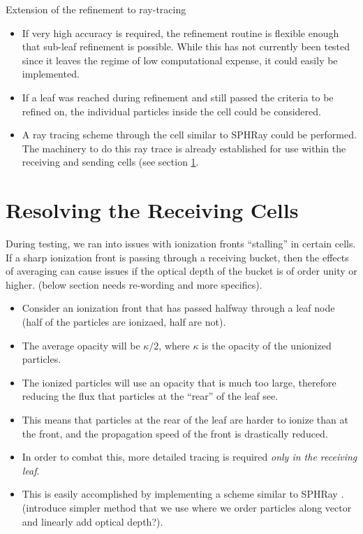 Extension of the refinement to ray-tracing
\begin{itemize}
\item If very high accuracy is required, the refinement routine is flexible enough that sub-leaf refinement is possible. While this has not currently been tested since it leaves the regime of low computational expense, it could easily be implemented.
\item If a leaf was reached during refinement and still passed the criteria to be refined on, the individual particles inside the cell could be considered.
\item A ray tracing scheme through the cell similar to SPHRay \citep{altayCroftPelupessy08} could be performed. The machinery to do this ray trace is already established for use within the receiving and sending cells (see section \ref{sec:resolvingleaves}.
\end{itemize}

\section{Resolving the Receiving Cells}
\label{sec:resolvingleaves}

During testing, we ran into issues with ionization fronts ``stalling'' in certain cells. If a sharp ionization front is passing through a receiving bucket, then the effects of averaging can cause issues if the optical depth of the bucket is of order unity or higher. (below section needs re-wording and more specifics).

\begin{itemize}
\item Consider an ionization front that has passed halfway through a leaf node (half of the particles are ionizaed, half are not).
\item The average opacity will be $\kappa/2$, where $\kappa$ is the opacity of the unionized particles.
\item The ionized particles will use an opacity that is much too large, therefore reducing the flux that particles at the ``rear'' of the leaf see.
\item This means that particles at the rear of the leaf are harder to ionize than at the front, and the propagation speed of the front is drastically reduced.
\item In order to combat this, more detailed tracing is required \emph{only in the receiving leaf}.
\item This is easily accomplished by implementing a scheme similar to SPHRay \citep{altayCroftPelupessi08}. (introduce simpler method that we use where we order particles along vector and linearly add optical depth?).
\end{itemize}

